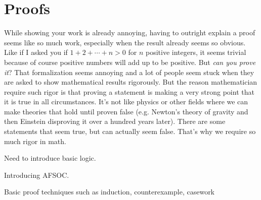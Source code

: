 \chapter{Proofs}

While showing your work is already annoying, having to outright explain a proof seems like so much work, especially when the result already seems so obvious.
Like if I asked you if $1 + 2 + \cdots + n > 0$ for $n$ positive integers, it seems trivial because of course positive numbers will add up to be positive.
But \textit{can you prove it}? That formalization seems annoying and a lot of people seem stuck when they are asked to show mathematical results rigorously.
But the reason mathematician require such rigor is that proving a statement is making a very strong point that it is true in all circumstances. It's not like physics or other fields where we can make theories that hold until proven false (e.g. Newton's theory of gravity and then Einstein disproving it over a hundred years later).
There are some statements that seem true, but can actually seem false. That's why we require so much rigor in math.

Need to introduce basic logic.


Introducing AFSOC.

Basic proof techniques such as induction, counterexample, casework